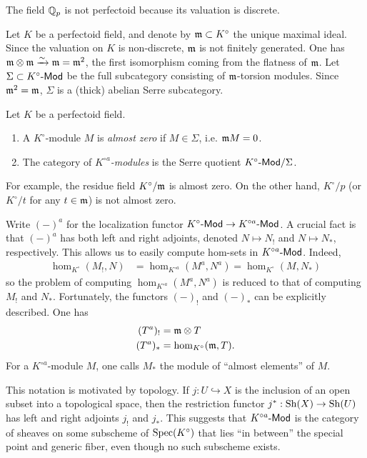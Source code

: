 \begin{example}
The field $\mathbb{Q}_p$ is not perfectoid because its valuation is discrete. 
\end{example}

Let $K$ be a perfectoid field, and denote by $\mathfrak{m}\subset K^\circ$ the unique 
maximal ideal. Since the valuation on $K$ is non-discrete, $\mathfrak{m}$ is not 
finitely generated. One has $\mathfrak{m}\otimes \mathfrak{m} \xrightarrow\sim \mathfrak{m} = \mathfrak{m}^2$, the 
first isomorphism coming from the flatness of $\mathfrak{m}$. Let 
$\Sigma\subset K^\circ\textnormal{-}\mathsf{Mod}$ be the full subcategory consisting of $\mathfrak{m}$-torsion 
modules. Since $\mathfrak{m}^2=\mathfrak{m}$, $\Sigma$ is a (thick) abelian Serre subcategory. 

\begin{definition} 
Let $K$ be a perfectoid field. 
\begin{enumerate}
  \item A $K^\circ$-module $M$ is \emph{almost zero} if $M\in\Sigma$, i.e. $\mathfrak{m} M=0$. 
  \item The category of \emph{$K^{\circ a}$-modules} is the Serre quotient 
    $K^\circ\textnormal{-}\mathsf{Mod} / \Sigma$. 
\end{enumerate}
\end{definition}

For example, the residue field $K^\circ/\mathfrak{m}$ is almost zero. On the other hand, 
$K^\circ/p$ (or $K^\circ / t$ for any $t\in \mathfrak{m}$) is not almost zero.

Write $(-)^a$ for the localization functor $K^\circ\textnormal{-}\mathsf{Mod} \to K^{\circ a}\textnormal{-}\mathsf{Mod}$. 
A crucial fact is that $(-)^a$ has both left and right adjoints, denoted 
$N\mapsto N_!$ and $N\mapsto N_\ast$, respectively. This allows us to easily 
compute hom-sets in $K^{\circ a}\textnormal{-}\mathsf{Mod}$. Indeed, 
\begin{align*}
  \hom_{K^\circ}(M_!,N) &= \hom_{K^{\circ a}}(M^a,N^a) = \hom_{K^\circ}(M,N_\ast)
\end{align*}
so the problem of computing $\hom_{K^{\circ a}}(M^a,N^a)$ is reduced to that 
of computing $M_!$ and $N_\ast$. Fortunately, the functors $(-)_!$ and 
$(-)_\ast$ can be explicitly described. One has 
\begin{align*}
  (T^a)_! &= \mathfrak{m}\otimes T \\
  (T^a)_\ast &= \hom_{K^\circ}(\mathfrak{m},T) .
\end{align*}
For a $K^{\circ a}$-module $M$, one calls $M_\ast$ the module of ``almost 
elements'' of $M$. 

This notation is motivated by topology. If $j:U\hookrightarrow X$ is the 
inclusion of an open subset into a topological space, then the restriction 
functor $j^\ast:\operatorname{Sh}(X) \to \operatorname{Sh}(U)$ has left and right adjoints 
$j_!$ and $j_\ast$. This suggests that $K^{\circ a}\textnormal{-}\mathsf{Mod}$ is the category 
of sheaves on some subscheme of $\operatorname{Spec}(K^\circ)$ that lies ``in between'' 
the special point and generic fiber, even though no such subscheme exists. 

